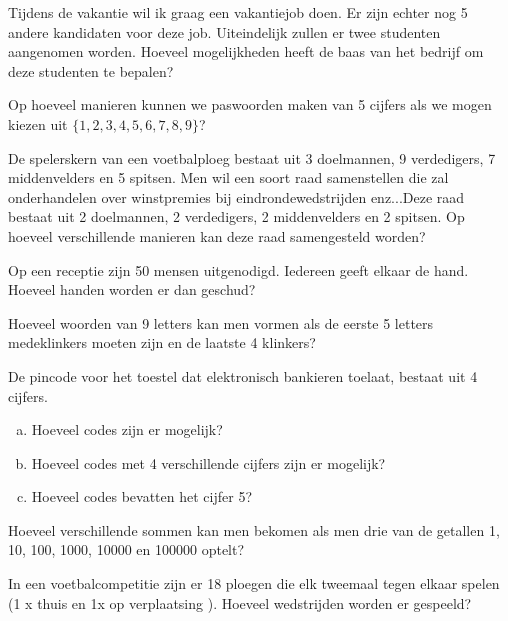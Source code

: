 \documentclass[12pt,twoside]{article}
\begin{document}
\begin{oefening}
Tijdens de vakantie wil ik graag een vakantiejob doen. Er zijn echter nog 5 andere
kandidaten voor deze job. Uiteindelijk zullen er twee studenten aangenomen worden.
Hoeveel mogelijkheden heeft de baas van het bedrijf om deze studenten te bepalen?
\end{oefening}

\begin{oefening}
Op hoeveel manieren kunnen we paswoorden maken van 5 cijfers als we mogen kiezen uit
$\{1,2,3,4,5,6,7,8,9\}$?
\end{oefening}

\begin{oefening}
De spelerskern van een voetbalploeg bestaat uit 3 doelmannen, 9 verdedigers, 7
middenvelders en 5 spitsen. Men wil een soort raad samenstellen die zal
onderhandelen over winstpremies bij eindrondewedstrijden enz...Deze raad bestaat
uit 2 doelmannen, 2 verdedigers, 2 middenvelders en 2 spitsen. Op hoeveel
verschillende manieren kan deze raad samengesteld worden?
\end{oefening}

\begin{oefening}
Op een receptie zijn 50 mensen uitgenodigd. Iedereen geeft elkaar de hand. Hoeveel handen worden
er dan geschud?
\end{oefening}

\begin{oefening}
Hoeveel woorden van 9 letters kan men vormen als de eerste 5 letters medeklinkers moeten zijn en
de laatste 4 klinkers?
\end{oefening}

\begin{oefening}
De pincode voor het toestel dat elektronisch bankieren toelaat, bestaat uit 4 cijfers.
\begin{enumerate}[(a)]
  \item Hoeveel codes zijn er mogelijk?
  \item Hoeveel codes met 4 verschillende cijfers zijn er mogelijk?
  \item Hoeveel codes bevatten het cijfer 5?
\end{enumerate}
\end{oefening}

\begin{oefening}
Hoeveel verschillende sommen kan men bekomen als men drie van de getallen 1, 10, 100, 1000,
10000 en 100000 optelt?
\end{oefening}

\begin{oefening}
In een voetbalcompetitie zijn er 18 ploegen die elk tweemaal tegen elkaar spelen (1 x thuis en 1x op
verplaatsing ). Hoeveel wedstrijden worden er gespeeld?
\end{oefening}





\end{document}
